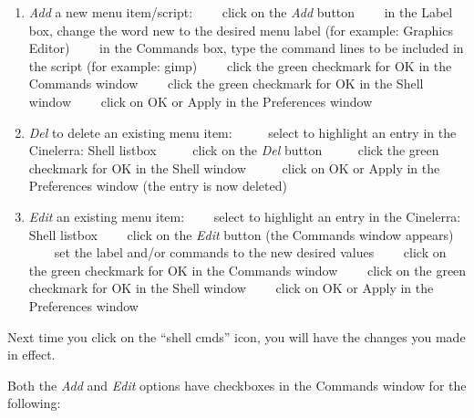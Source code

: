 \begin{enumerate}[nosep,]
	\item \textit{Add} a new menu item/script:\newline
\ \ \ \ click on the \textit{Add} button\newline
\ \ \ \ in the Label box, change the word {\textquotedbl}new{\textquotedbl} to the desired menu label (for example:
Graphics Editor)\newline
\ \ \ \ in the Commands box, type the command lines to be included in the script (for example: gimp)\newline
\ \ \ \ click the green checkmark for OK in the Commands window\newline
\ \ \ \ click the green checkmark for OK in the Shell window\newline
\ \ \ \ click on OK or Apply in the Preferences window\newline
	\item \textit{Del} to delete an existing menu item:\newline
\ \ \ \ \ select to highlight an entry in the Cinelerra: Shell listbox\newline
\ \ \ \ \ click on the \textit{Del }button\newline
\ \ \ \ \ click the green checkmark for OK in the Shell window\newline
\ \ \ \ \ click on OK or Apply in the Preferences window (the entry is now deleted)\newline
	\item \textit{Edit} an existing menu item:\newline
\ \ \ \ select to highlight an entry in the Cinelerra: Shell listbox\newline
\ \ \ \ click on the \textit{Edit} button (the Commands window appears)\newline
\ \ \ \ set the label and/or commands to the new desired values\newline
\ \ \ \ click on the green checkmark for OK in the Commands window\newline
\ \ \ \ click on the green checkmark for OK in the Shell window\newline
\ \ \ \ click on OK or Apply in the Preferences window
\end{enumerate}
\medskip
	
Next time you click on the ``shell cmds'' icon, you will have the changes you made in effect.\newline

Both the \textit{Add} and \textit{Edit} options have checkboxes in the Commands window for the following:
\medskip

